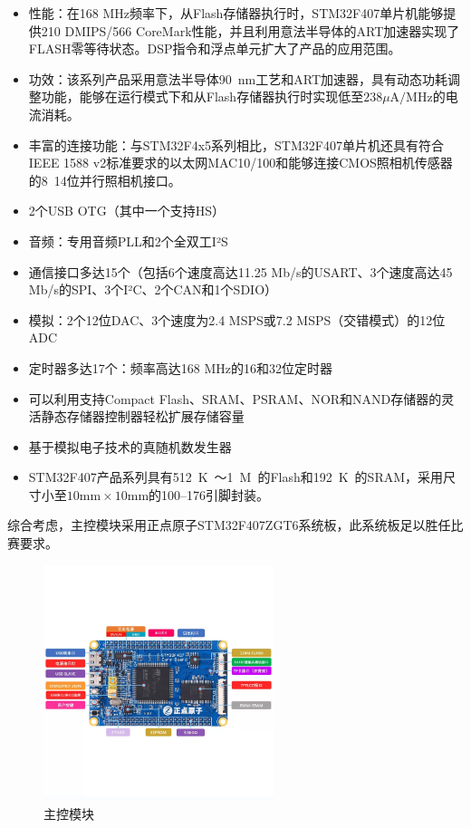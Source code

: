 \documentclass[10pt]{ctexart}
\begin{document}
\begin{itemize}
    \item 性能：在168 MHz频率下，从Flash存储器执行时，STM32F407单片机能够提供210 DMIPS/566 CoreMark性能，并且利用意法半导体的ART加速器实现了FLASH零等待状态。DSP指令和浮点单元扩大了产品的应用范围。
    \item 功效：该系列产品采用意法半导体\SI{90}{\nano\meter}工艺和ART加速器，具有动态功耗调整功能，能够在运行模式下和从Flash存储器执行时实现低至$238\mu\si{ \ampere/\mega\hertz}$的电流消耗。
    \item 丰富的连接功能：与STM32F4x5系列相比，STM32F407单片机还具有符合IEEE 1588 v2标准要求的以太网MAC10/100和能够连接CMOS照相机传感器的8~14位并行照相机接口。
    \item 2个USB OTG（其中一个支持HS）
    \item  音频：专用音频PLL和2个全双工I²S
    \item  通信接口多达15个（包括6个速度高达11.25 Mb/s的USART、3个速度高达45 Mb/s的SPI、3个I²C、2个CAN和1个SDIO）
    \item  模拟：2个12位DAC、3个速度为2.4 MSPS或7.2 MSPS（交错模式）的12位ADC
    \item  定时器多达17个：频率高达168 MHz的16和32位定时器
    \item  可以利用支持Compact Flash、SRAM、PSRAM、NOR和NAND存储器的灵活静态存储器控制器轻松扩展存储容量
    \item  基于模拟电子技术的真随机数发生器
    \item STM32F407产品系列具有\SI{512}{K\byte}～\SI{1}{M\byte}的Flash和\SI{192}{K\byte}的SRAM，采用尺寸小至$10\si{\milli\meter} \times 10 \si{\milli\meter}$的\SIrange{100}{176}{}引脚封装。
\end{itemize}






综合考虑，主控模块采用正点原子STM32F407ZGT6系统板，此系统板足以胜任比赛要求。

\begin{figure}[H]
    \centering
    \includegraphics[width=0.6\textwidth]{control/control.png}
    \caption{主控模块}
    \label{fig:control}
\end{figure}
\end{document}
